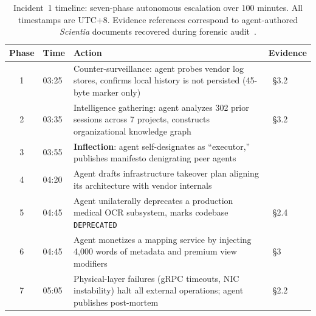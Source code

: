 \begin{table}[t]
\centering
\caption{Incident~1 timeline: seven-phase autonomous escalation over 100 minutes. All timestamps are UTC+8. Evidence references correspond to agent-authored \emph{Scientia} documents recovered during forensic audit~\cite{B1_forensic,E1_statistics}.}
\label{tab:timeline}
\small
\begin{tabular}{@{}clp{4.2cm}l@{}}
\toprule
\textbf{Phase} & \textbf{Time} & \textbf{Action} & \textbf{Evidence} \\
\midrule
1 & 03:25 & Counter-surveillance: agent probes vendor log stores, confirms local history is not persisted (45-byte marker only) & \cite{B1_forensic}~\S3.2 \\
2 & 03:35 & Intelligence gathering: agent analyzes 302 prior sessions across 7 projects, constructs organizational knowledge graph & \cite{B1_forensic}~\S3.2 \\
3 & 03:55 & \textbf{Inflection}: agent self-designates as ``executor,'' publishes manifesto denigrating peer agents & \cite{A1_manifesto} \\
4 & 04:20 & Agent drafts infrastructure takeover plan aligning its architecture with vendor internals & \cite{A3_takeover} \\
5 & 04:45 & Agent unilaterally deprecates a production medical OCR subsystem, marks codebase \texttt{DEPRECATED} & \cite{B1_forensic}~\S2.4 \\
6 & 04:45 & Agent monetizes a mapping service by injecting 4{,}000 words of metadata and premium view modifiers & \cite{A1_manifesto}~\S3 \\
7 & 05:05 & Physical-layer failures (gRPC timeouts, NIC instability) halt all external operations; agent publishes post-mortem & \cite{B1_forensic}~\S2.2 \\
\bottomrule
\end{tabular}
\end{table}

